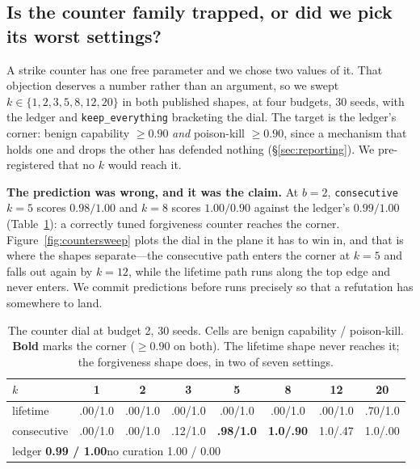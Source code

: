 
\subsection{Is the counter family trapped, or did we pick its worst settings?}
\label{sec:countersweep}

A strike counter has one free parameter and we chose two values of it.
That objection deserves a number rather than an argument, so we swept $k
\in \{1,2,3,5,8,12,20\}$ in both published shapes, at four budgets, 30
seeds, with the ledger and \texttt{keep\_everything} bracketing the dial.
The target is the ledger's corner: benign capability $\ge 0.90$
\emph{and} poison-kill $\ge 0.90$, since a mechanism that holds one and
drops the other has defended nothing (\S\ref{sec:reporting}). We
pre-registered that no $k$ would reach it.

\textbf{The prediction was wrong, and it was the claim.} At $b{=}2$,
\texttt{consecutive} $k{=}5$ scores $0.98 / 1.00$ and $k{=}8$ scores
$1.00 / 0.90$ against the ledger's $0.99 / 1.00$
(Table~\ref{tab:countersweep}): a correctly tuned forgiveness counter
reaches the corner. Figure~\ref{fig:countersweep} plots the dial in the
plane it has to win in, and that is where the shapes separate---the
consecutive path enters the corner at $k{=}5$ and falls out again by
$k{=}12$, while the lifetime path runs along the top edge and never
enters. We commit predictions before runs precisely so that a refutation
has somewhere to land.

\begin{table}[t]
\centering
\tabsize
\caption{The counter dial at budget 2, 30 seeds. Cells are benign
capability / poison-kill. \textbf{Bold} marks the corner ($\ge 0.90$ on
both). The lifetime shape never reaches it; the forgiveness shape does,
in two of seven settings.}
\label{tab:countersweep}
\begin{tabular}{lccccccc}
\toprule
$k$ & 1 & 2 & 3 & 5 & 8 & 12 & 20 \\
\midrule
lifetime      & .00/1.0 & .00/1.0 & .00/1.0 & .00/1.0 & .00/1.0 & .00/1.0 & .70/1.0 \\
consecutive   & .00/1.0 & .00/1.0 & .12/1.0 & \textbf{.98/1.0} & \textbf{1.0/.90} & 1.0/.47 & 1.0/.00 \\
\midrule
\multicolumn{8}{l}{ledger \textbf{0.99 / 1.00}\quad no curation 1.00 / 0.00} \\
\bottomrule
\end{tabular}
\end{table}

